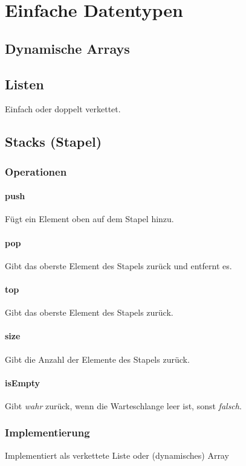 \section{Einfache Datentypen}
\label{sec:EinfacheDatentypen}
%
%
\subsection{Dynamische Arrays}
\label{subsec:DynamischeArrays}
%
%
\subsection{Listen}
\label{subsec:Listen}
Einfach oder doppelt verkettet.
%
%
\subsection{Stacks (Stapel)}
\label{subsec:Stacks}

\subsubsection{Operationen}

\paragraph{push} Fügt ein Element oben auf dem Stapel hinzu.
\paragraph{pop} Gibt das oberste Element des Stapels zurück und entfernt es.
\paragraph{top} Gibt das oberste Element des Stapels zurück.
\paragraph{size} Gibt die Anzahl der Elemente des Stapels zurück.
\paragraph{isEmpty} Gibt \textit{wahr} zurück, wenn die Warteschlange leer ist, sonst \textit{falsch}.

\subsubsection{Implementierung}
Implementiert als verkettete Liste oder (dynamisches) Array
%
%
